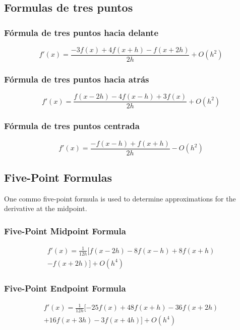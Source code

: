 \subsection{Formulas de tres puntos}
\subsubsection{Fórmula de tres puntos hacia delante}
\begin{equation}
    f'(x) = \frac{-3 f(x) + 4 f(x + h) - f(x + 2h)}{2h}  + O(h^2)
\end{equation}

\subsubsection{Fórmula de tres puntos hacia atrás}
\begin{equation}
    f'(x) = \frac{f(x - 2h) - 4 f(x - h) + 3 f(x)}{2h} + O(h^2)
\end{equation}

\subsubsection{Fórmula de tres puntos centrada}
\begin{equation}
    f'(x) = \frac{-f(x - h) + f(x + h)}{2h} - O(h^2)
\end{equation}

\subsection{Five-Point Formulas}
One commo five-point formula is used to determine approximations for the derivative at the midpoint.

\subsubsection{Five-Point Midpoint Formula}
\begin{multline}
    f'(x) = \frac{1}{12h} [ f(x -2h) - 8f(x -h) + 8 f(x + h) \\
    - f(x + 2h) ] + O(h^4)
\end{multline}

\subsubsection{Five-Point Endpoint Formula}
\begin{multline}
    f'(x) = \frac{1}{12h} [ -25f(x) + 48 f(x + h) - 36 f(x + 2h) \\
    + 16 f(x + 3h) - 3 f(x + 4h) ] + O(h^4)
\end{multline}

